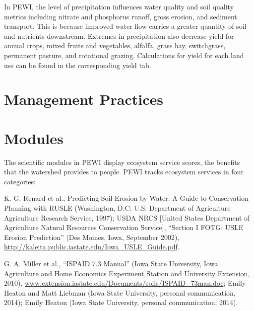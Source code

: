 \documentclass[11pt]{article}
\begin{document}
In PEWI, the level of precipitation influences water quality and soil quality metrics including nitrate and phosphorus runoff, gross erosion, and sediment transport. This is because improved water flow carries a greater quantity of soil and nutrients downstream. Extremes in precipitation also decrease yield for annual crops, mixed fruits and vegetables, alfalfa, grass hay, switchgrass, permanent pasture, and rotational grazing.\cite{33}  Calculations for yield for each land use can be found in the corresponding yield tab.


\newpage
\section{Management Practices}


\newpage
\section{Modules}
The scientific modules in PEWI display ecosystem service scores, the benefits that the watershed provides to people. PEWI tracks ecosystem services in four categories: 

\cleardoublepage


\begin{thebibliography}{1}

   K. G. Renard et al., Predicting Soil Erosion by Water: A Guide to Conservation Planning with RUSLE (Washington, D.C: U.S. Department of Agriculture Agriculture Research Service, 1997); USDA NRCS [United States Department of Agriculture Natural Resources Conservation Service], “Section I FOTG: USLE Erosion Prediction” (Des Moines, Iowa, September 2002), \url{http://kaleita.public.iastate.edu/Iowa_USLE_Guide.pdf}.
  
   G. A. Miller et al., “ISPAID 7.3 Manual” (Iowa State University, Iowa Agriculture and Home Economics Experiment Station and University Extension, 2010), \url{www.extension.iastate.edu/Documents/soils/ISPAID_73man.doc}; Emily Heaton and Matt Liebman (Iowa State University, personal communication, 2014); Emily Heaton (Iowa State University, personal communication, 2014).
  
  
\end{thebibliography}
\end{document}
